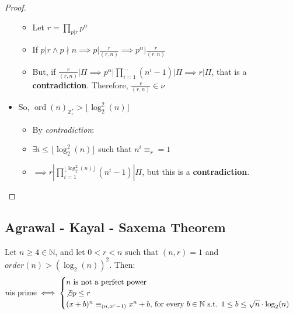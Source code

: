 \begin{proof}
\begin{itemize}
\begin{itemize}
            \item Let $r = \prod_{p|r} p^{\alpha}$
            \item If $p | r \land p \nmid n \implies p | \frac{r}{(r,n)} \implies p^{\alpha} | \frac{r}{(r,n)}$
            \item But, if $\frac{r}{(r,n)} | \Pi \implies p^{\alpha} | \prod_{i=1}^{\dots} (n^{i} - 1) | \Pi \implies r | \Pi$, that is a \textbf{contradiction}. Therefore, $\frac{r}{(r,n)} \in \nu$
        \end{itemize}
        \item So, $\operatorname{ord}(n)_{\mathbb{Z}_{r}^{*}} > \lfloor \operatorname{log}_{2}^{2}(n) \rfloor$
        \begin{itemize}
            \item By \emph{contradiction}:
            \item $\exists i \leq \lfloor \operatorname{log}_{2}^{2}(n) \rfloor$ such that $n^{i} \equiv_{r} = 1$
            \item $\implies r | \prod_{i = 1}^{\lfloor \operatorname{log}_{2}^{2}(n) \rfloor}(n^{i} - 1) | \Pi$, but this is a \textbf{contradiction}.
        \end{itemize}

    \end{itemize}
\end{proof}

\subsection{Agrawal - Kayal - Saxema Theorem}
\begin{theorem}\label{aks_theorem}
    Let $n \geq 4 \in \mathbb{N}$, and let $0 < r < n$ such that $(n,r) = 1$ and $order(n) > (\operatorname{log}_{2}(n))^{2}$. Then:
    \[
    n \text{is prime} \iff
         \begin{cases}
           n \text{ is not a perfect power } \\
           \not\exists p \leq r \\
           (x + b)^{n} \equiv_{(n, x^{r} - 1)} x^{n} + b \text{, for every } b \in \mathbb{N} \text{ s.t. } 1 \leq b \leq \sqrt{n} \cdot \operatorname{log}_{2}(n)
         \end{cases}
    \]
\end{theorem}

